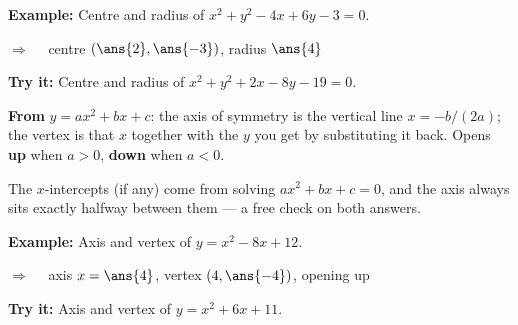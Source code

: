 \documentclass[12pt]{article}
\begin{document}
\begin{examplebox}
\textbf{Example:} \quad Centre and radius of $x^2 + y^2 - 4x + 6y - 3 = 0$.

$\Rightarrow\quad$ centre $(\ans{2}, \ans{-3})$, \quad radius $\ans{4}$
\end{examplebox}

\begin{tryitbox}
\textbf{Try it:} \quad Centre and radius of $x^2 + y^2 + 2x - 8y - 19 = 0$.\\[2pt]
\end{tryitbox}


\begin{formulabox}
\textbf{From} $y = ax^2 + bx + c$: the axis of symmetry is the vertical line
$x = -b/(2a)$; the vertex is that $x$ together with the $y$ you get by substituting it
back. Opens \textbf{up} when $a > 0$, \textbf{down} when $a < 0$.\par
\smallskip
The $x$-intercepts (if any) come from solving $ax^2 + bx + c = 0$, and the axis always
sits exactly halfway between them --- a free check on both answers.
\end{formulabox}

\begin{examplebox}
\textbf{Example:} \quad Axis and vertex of $y = x^2 - 8x + 12$.

$\Rightarrow\quad$ axis $x = \ans{4}$, \quad vertex $(4, \ans{-4})$, opening up
\end{examplebox}

\begin{tryitbox}
\textbf{Try it:} \quad Axis and vertex of $y = x^2 + 6x + 11$.\\[2pt]
\end{tryitbox}

\end{document}
